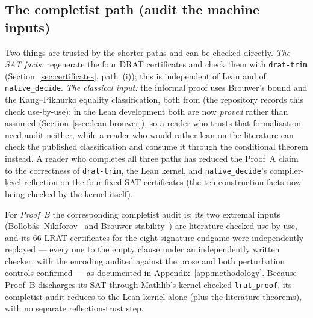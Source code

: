 \documentclass[11pt,reqno]{amsart}
\theoremstyle{definition}
\theoremstyle{remark}
\begin{document}
\subsection*{The completist path (audit the machine inputs)}
Two things are trusted by the shorter paths and can be checked directly.
\emph{The SAT facts:} regenerate the four DRAT certificates and check them with
\texttt{drat-trim} (Section~\ref{sec:certificates}, path~(i)); this is independent of
Lean and of \texttt{native\_decide}. \emph{The classical input:} the informal proof
uses Brouwer's bound and the Kang--Pikhurko equality classification, both from
\cite{Brouwer81,KP05} (the repository records this check use-by-use); in the Lean
development both are now \emph{proved} rather than assumed
(Section~\ref{ssec:lean-brouwer}), so a reader who trusts that formalisation need audit
neither, while a reader who would rather lean on the literature can check the published
classification and consume it through the conditional theorem instead. A reader who
completes all three paths has reduced the Proof~A claim to the correctness of
\texttt{drat-trim}, the Lean kernel, and \texttt{native\_decide}'s compiler-level
reflection on the four fixed SAT certificates (the ten construction facts now being
checked by the kernel itself).

For \emph{Proof~B} the corresponding completist audit is: its two extremal inputs
(Bollob\'as--Nikiforov~\cite{BN05} and Brouwer stability~\cite{Brouwer81}) are
literature-checked use-by-use, and its $66$ LRAT certificates for the eight-signature
endgame were independently replayed --- every one to the empty clause under an
independently written checker, with the encoding audited against the prose and both
perturbation controls confirmed --- as documented in Appendix~\ref{app:methodology}.
Because Proof~B discharges its SAT through Mathlib's kernel-checked \texttt{lrat\_proof},
its completist audit reduces to the Lean kernel alone (plus the literature theorems), with
no separate reflection-trust step.
\end{document}

